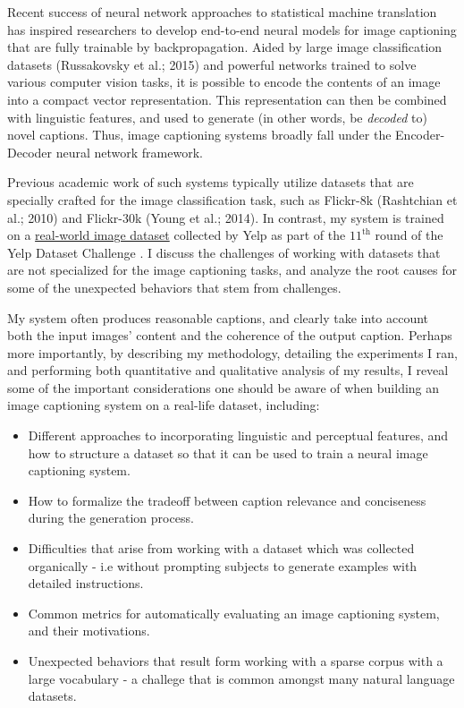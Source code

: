 \documentclass[letterpaper, 10 pt, conference]{ieeeconf}
\begin{document}
Recent success of neural network approaches to statistical machine translation has inspired researchers to develop end-to-end neural models for image captioning that are fully trainable by backpropagation. Aided by large image classification datasets (Russakovsky et al.; 2015) and powerful networks trained to solve various computer vision tasks, it is possible to encode the contents of an image into a compact vector representation. This representation can then be combined with linguistic features, and used to generate (in other words, be \textit{decoded} to) novel captions. Thus, image captioning systems broadly fall under the Encoder-Decoder neural network framework. 

Previous academic work of such systems typically utilize datasets that are specially crafted for the image classification task, such as Flickr-8k (Rashtchian et al.; 2010) and Flickr-30k (Young et al.; 2014). In contrast, my system is trained on a \href{https://www.yelp.com/dataset}{real-world image dataset} collected by Yelp as part of the $11^{\text{th}}$ round of the Yelp Dataset Challenge . I discuss the challenges of working with datasets that are not specialized for the image captioning tasks, and analyze the root causes for some of the unexpected behaviors that stem from challenges. 

My system often produces reasonable captions, and clearly take into account both the input images' content and the coherence of the output caption. Perhaps more importantly, by describing my methodology, detailing the experiments I ran, and performing both quantitative and qualitative analysis of my results, I reveal some of the important considerations one should be aware of when building an image captioning system on a real-life dataset, including:
\begin{itemize}
\item Different approaches to incorporating linguistic and perceptual features, and how to structure a dataset so that it can be used to train a neural image captioning system.
\item How to formalize the tradeoff between caption relevance and conciseness during the generation process.
\item Difficulties that arise from working with a dataset which was collected organically - i.e without prompting subjects to generate examples with detailed instructions.
\item Common metrics for automatically evaluating an image captioning system, and their motivations.
\item Unexpected behaviors that result form working with a sparse corpus with a large vocabulary - a challege that is common amongst many natural language datasets. 
\end{itemize}
\end{document}

